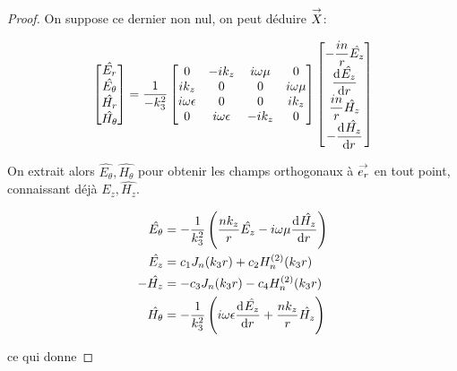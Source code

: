\begin{proof}

    On suppose ce dernier non nul, on peut déduire \(\vect{X}\):

    \begin{equation*}
      \begin{bmatrix}
        \hat{E_r}\\
        \hat{E_\theta}\\
        \hat{H_r}\\
        \hat{H_\theta}
      \end{bmatrix} =
      \frac{1}{-k_3^2}
      \begin{bmatrix}
      0 & -ik_z & i\w\mu & 0
      \\
      ik_z & 0 & 0 & i\w\mu
      \\
      i\w\eps & 0 & 0 & ik_z
      \\
      0 & i\w\eps & -ik_z & 0
      \end{bmatrix}
      \begin{bmatrix}
        -\frac{in}{r}\hat{E_z}\\
        \ddp{r}{\hat{E_z}}\\
        \frac{in}{r}\hat{H_z}\\
        -\ddp{r}{\hat{H_z}}
      \end{bmatrix}
    \end{equation*}

    On extrait alors \(\hat{E_\theta}, \hat{H_\theta}\) pour obtenir les champs orthogonaux à \(\vect{e_r}\) en tout point, connaissant déjà \(\hat{E_z}, \hat{H_z}\).

    \begin{align*}
      \hat{E_\theta} &= -\frac{1}{k_3^2}\left(\frac{nk_z}{r}\hat{E_z} - i\w\mu\ddp{r}{\hat{H_z}}\right)
      \\
      \hat{E_z} &= c_1 J_n(k_3 r) + c_2 H_n^{(2)}(k_3 r)
      \\
      -\hat{H_z} &= -c_3 J_n(k_3 r) - c_4 H_n^{(2)}(k_3 r)
      \\
      \hat{H_\theta} &= -\frac{1}{k_3^2}\left(i\w\eps\ddp{r}{\hat{E_z}} + \frac{nk_z}{r}\hat{H_z}\right)
    \end{align*}

    ce qui donne


\end{proof}
